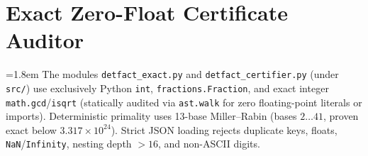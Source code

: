 \documentclass[10pt,twocolumn]{article}
\begin{document}
\section{Exact Zero-Float Certificate Auditor}\label{sec:certifier}
{\emergencystretch=1.8em
The modules \texttt{detfact\_\allowbreak exact.py} and \texttt{detfact\_\allowbreak certifier.py} (under \texttt{src/}) use exclusively Python \texttt{int}, \texttt{fractions.\allowbreak Fraction}, and exact integer \texttt{math.\allowbreak gcd}/\texttt{isqrt} (statically audited via \texttt{ast.walk} for zero floating-point literals or imports). Deterministic primality uses 13-base Miller--Rabin (bases $2\dots 41$, proven exact below $3.317\times 10^{24}$). Strict JSON loading rejects duplicate keys, floats, \texttt{NaN}/\texttt{Infinity}, nesting depth $>16$, and non-ASCII digits.

}
\end{document}
